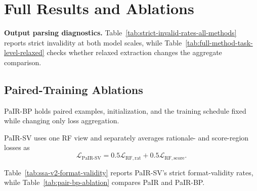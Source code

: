 \clearpage
\section{Full Results and Ablations}
\label{app:full-results}

\noindent\textbf{Output parsing diagnostics.}
Table~\ref{tab:strict-invalid-rates-all-methods} reports strict invalidity
at both model scales, while Table~\ref{tab:full-method-task-level-relaxed} checks
whether relaxed extraction changes the aggregate comparison.

\subsection{Paired-Training Ablations}
\label{app:ssa-v2-ablation}

PaIR-BP holds paired examples, initialization, and the training schedule
fixed while changing only loss aggregation.

PaIR-SV uses one RF view and separately averages rationale- and score-region
losses as
\[
\mathcal{L}_{\mathrm{PaIR\text{-}SV}}
=0.5\mathcal{L}_{\mathrm{RF,rat}}
+0.5\mathcal{L}_{\mathrm{RF,score}}.
\]

Table~\ref{tab:ssa-v2-format-validity} reports PaIR-SV's strict format-validity
rates, while Table~\ref{tab:pair-bp-ablation} compares PaIR and PaIR-BP.

